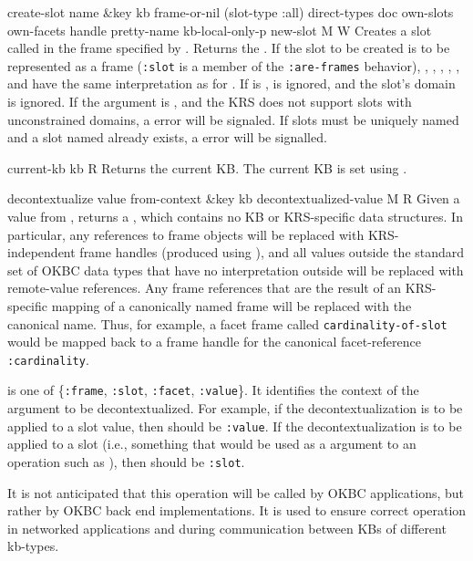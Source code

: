 \begin{okbcop}{create-slot}{ name \&key kb frame-or-nil (slot-type :all) direct-types doc own-slots own-facets handle pretty-name kb-local-only-p} { new-slot } { M } { W } {  }
Creates a slot called  in the frame specified by
   .  Returns the .  If the slot to be
   created is to be represented as a frame ({\tt :slot} is a member of the
   {\tt :are-frames} behavior), ,
   , , , , and
    have the same interpretation as for .
   If  is \false,  is ignored, and the
   slot's domain is ignored.  If the
    argument is \false, and the KRS does not support slots with
   unconstrained domains, a  error will be signaled.
   If slots must be uniquely named and a slot named  already
   exists, a  error will be signalled.
\end{okbcop}

\begin{okbcfun}{current-kb}{ } { kb } {   } { R } {  }
Returns the current KB.  The current KB is set using .
\end{okbcfun}

\begin{okbcop}{decontextualize}{ value from-context \&key kb} { decontextualized-value } { M } { R } {  }
Given a value from , returns a
   , which contains no KB or KRS-specific
   data structures.  In particular,
   any references to frame objects will be replaced with KRS-independent frame
   handles (produced using ), and all
   values outside the standard set of OKBC data types that have
   no interpretation outside  will be
   replaced with remote-value references.  Any frame references that are
   the result of an KRS-specific mapping of a canonically named frame will be
   replaced with the canonical name.  Thus, for example, a facet
   frame called {\tt cardinality-of-slot} would be mapped back to a frame
   handle for the canonical facet-reference {\tt :cardinality}.

    is one of \{{\tt :frame}, {\tt :slot},
   {\tt :facet}, {\tt :value}\}.  It identifies the context of the argument
   to be decontextualized.  For example, if the
   decontextualization is to be applied to a slot value, then
    should be {\tt :value}.  If the
   decontextualization is to be applied to a slot (i.e., something that would
   be used as a  argument to an operation such as
   ), then  should be {\tt :slot}.

   It is not anticipated that this operation will be called by OKBC
   applications, but rather by OKBC back end implementations.  It is used to
   ensure correct operation in networked applications and during communication
   between KBs of different kb-types.
\end{okbcop}

